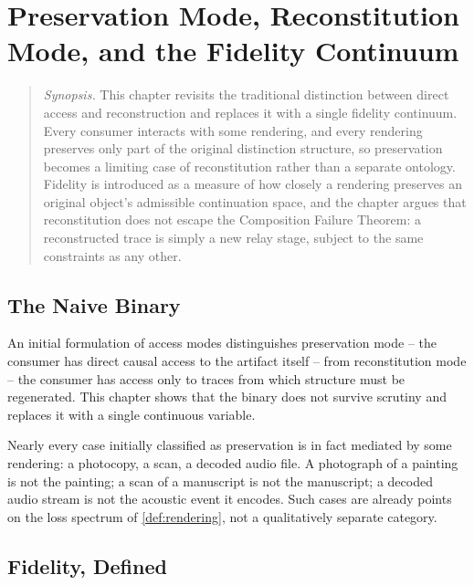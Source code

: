 \chapter{Preservation Mode, Reconstitution Mode, and the Fidelity Continuum}
\label{ch:fidelity-continuum}

\begin{quotation}
\noindent\textit{Synopsis.} This chapter revisits the traditional
distinction between direct access and reconstruction and replaces it with a
single fidelity continuum. Every consumer interacts with some rendering,
and every rendering preserves only part of the original distinction
structure, so preservation becomes a limiting case of reconstitution rather
than a separate ontology. Fidelity is introduced as a measure of how
closely a rendering preserves an original object's admissible continuation
space, and the chapter argues that reconstitution does not escape the
Composition Failure Theorem: a reconstructed trace is simply a new relay
stage, subject to the same constraints as any other.
\end{quotation}

\section{The Naive Binary}

An initial formulation of access modes distinguishes preservation mode --
the consumer has direct causal access to the artifact itself -- from
reconstitution mode -- the consumer has access only to traces from which
structure must be regenerated. This chapter shows that the binary does
not survive scrutiny and replaces it with a single continuous variable.

\begin{remark}
\label{rem:binary-fails}
Nearly every case initially classified as preservation is in fact
mediated by some rendering: a photocopy, a scan, a decoded audio file. A
photograph of a painting is not the painting; a scan of a manuscript is
not the manuscript; a decoded audio stream is not the acoustic event it
encodes. Such cases are already points on the loss spectrum of
\cref{def:rendering}, not a qualitatively separate category.
\end{remark}

\section{Fidelity, Defined}

